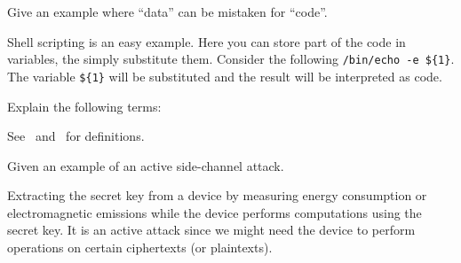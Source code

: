 \documentclass[svv,addpoints]{miunexam}
\begin{document}
\begin{questions}
  
\question[3]\label{q:software}
Give an example where \enquote{data} can be mistaken for \enquote{code}.

\begin{solution}
  Shell scripting is an easy example.
  Here you can store part of the code in variables, the simply substitute them.
  Consider the following \texttt{/bin/echo -e \$\{1\}}.
  The variable \texttt{\$\{1\}} will be substituted and the result will be 
  interpreted as code.
\end{solution}



\question\label{q:crypto:foundations:E}
  Explain the following terms:

  \begin{solution}
    See~\cite{Gollmann2011cs} and~\cite{Anderson2008sea} for definitions.
  \end{solution}


  
\question[3]\label{q:sidechannels}
Given an example of an active side-channel attack.

\begin{solution}
  Extracting the secret key from a device by measuring energy consumption or 
  electromagnetic emissions while the device performs computations using the 
  secret key.
  It is an active attack since we might need the device to perform operations 
  on certain ciphertexts (or plaintexts).
\end{solution}




\end{questions}


\printbibliography
\end{document}

